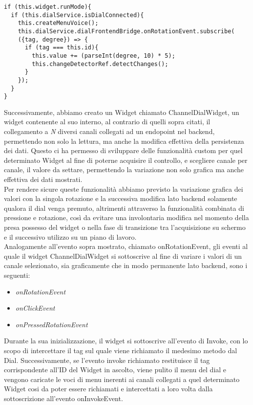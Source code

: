 \begin{lstlisting}[caption={Sottoscrizione evento rotazione},style=javaScriptCode]
if (this.widget.runMode){
  if (this.dialService.isDialConnected){
	this.createMenuVoice();
	this.dialService.dialFrontendBridge.onRotationEvent.subscribe(
	({tag, degree}) => {
	  if (tag === this.id){
		this.value += (parseInt(degree, 10) * 5);
		this.changeDetectorRef.detectChanges();
	  }
	});
  }
}
\end{lstlisting} 

Successivamente, abbiamo creato un Widget chiamato ChannelDialWidget, un widget contenente al suo interno, al contrario di quelli sopra citati, il collegamento a \emph{N} diversi canali collegati ad un endopoint nel backend, permettendo non solo la lettura, ma anche la modifica effettiva della persistenza dei dati.
Questo ci ha permesso di sviluppare delle funzionalità custom per quel determinato Widget al fine di poterne acquisire il controllo, e scegliere canale per canale, il valore da settare, permettendo la variazione non solo grafica ma anche effettiva dei dati mostrati.\\

Per rendere sicure queste funzionalità abbiamo previsto la variazione grafica dei valori con la singola rotazione e la successiva modifica lato backend solamente qualora il dial venga premuto, altrimenti attraverso la funzionalità combinata di pressione e rotazione, così da evitare una involontaria modifica nel momento della presa possesso del widget o nella fase di transizione tra l'acquisizione su schermo e il successivo utilizzo su un piano di lavoro.\\

Analogamente all'evento sopra mostrato, chiamato onRotationEvent, gli eventi al quale il widget ChannelDialWidget si sottoscrive al fine di variare i valori di un canale selezionato, sia graficamente che in modo permanente lato backend, sono i seguenti:

\begin{itemize}
\item \emph{onRotationEvent} 
\item \emph{onClickEvent} 
\item \emph{onPressedRotationEvent}
\end{itemize}

Durante la sua inizializzazione, il widget si sottoscrive all'evento di Invoke, con lo scopo di intercettare il tag sul quale viene richiamato il medesimo metodo dal Dial. Successivamente, se l'evento invoke richiamato restituisce il tag corrispondente all'ID del Widget in ascolto, viene pulito il menu del dial e vengono caricate le voci di menu inerenti ai canali collegati a quel determinato Widget cosi da poter essere richiamati e intercettati a loro volta dalla sottoscrizione all'evento onInvokeEvent.
 
